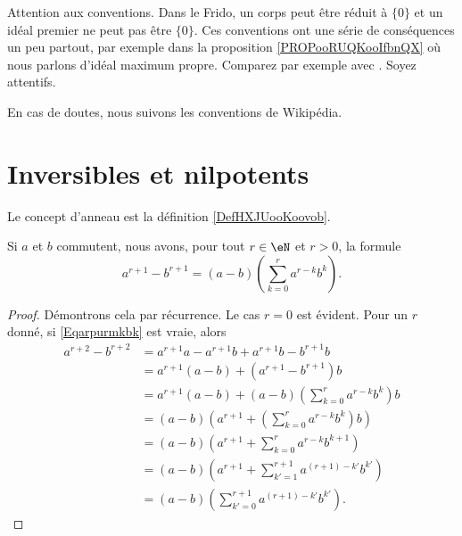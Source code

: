 
Attention aux conventions. Dans le Frido, un corps peut être réduit à \( \{ 0 \}\) et un idéal premier ne peut pas être \( \{ 0 \}\). Ces conventions ont une série de conséquences un peu partout, par exemple dans la proposition \ref{PROPooRUQKooIfbnQX} où nous parlons d'idéal maximum propre. Comparez par exemple avec \cite{ooWEUDooQybvIx}. Soyez attentifs.

En cas de doutes, nous suivons les conventions de Wikipédia.

\section{Inversibles et nilpotents}

Le concept d'anneau est la définition \ref{DefHXJUooKoovob}.

\begin{lemma}       \label{LEMooOYZEooLivKWI}
	Si \( a\) et \( b\) commutent, nous avons, pour tout \( r \in \eN \) et \( r > 0\), la formule
	\begin{equation}        \label{Eqarpurmkbk}
		a^{r+1}-b^{r+1}=(a-b)\left(\sum_{k=0}^ra^{r-k}b^k\right).
	\end{equation}
\end{lemma}

\begin{proof}
	Démontrons cela par récurrence. Le cas \( r = 0 \) est évident. Pour
	un \( r \) donné, si \eqref{Eqarpurmkbk} est vraie, alors
	\begin{align*}
		a^{r+2}-b^{r+2} & = a^{r+1}a - a^{r+1}b +a^{r+1}b - b^{r+1}b                            \\
		                & = a^{r+1}(a - b) + (a^{r+1} - b^{r+1})b                               \\
		                & = a^{r+1}(a - b) + (a-b)\left(\sum_{k=0}^ra^{r-k}b^k\right)b          \\
		                & = (a - b) \left(a^{r+1} + \left(\sum_{k=0}^ra^{r-k}b^k\right)b\right) \\
		                & = (a - b) \left(a^{r+1} + \sum_{k=0}^ra^{r-k}b^{k + 1}\right)         \\
		                & = (a - b) \left(a^{r+1} + \sum_{k'=1}^{r+1}a^{(r+1)-k'}b^{k'}\right)  \\
		                & = (a - b) \left(\sum_{k'=0}^{r+1}a^{(r+1)-k'}b^{k'}\right).
	\end{align*}
\end{proof}

